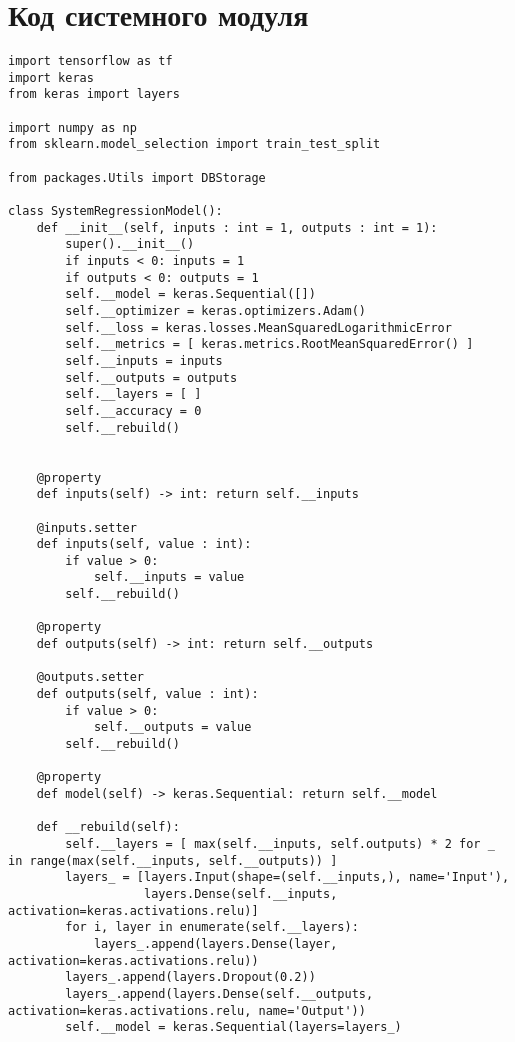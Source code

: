 \chapter{Код системного модуля}
\label{cha:appendix1}

\begin{verbatim}
import tensorflow as tf
import keras
from keras import layers

import numpy as np
from sklearn.model_selection import train_test_split

from packages.Utils import DBStorage

class SystemRegressionModel():
    def __init__(self, inputs : int = 1, outputs : int = 1):
        super().__init__()
        if inputs < 0: inputs = 1
        if outputs < 0: outputs = 1
        self.__model = keras.Sequential([])
        self.__optimizer = keras.optimizers.Adam()
        self.__loss = keras.losses.MeanSquaredLogarithmicError
        self.__metrics = [ keras.metrics.RootMeanSquaredError() ]
        self.__inputs = inputs
        self.__outputs = outputs
        self.__layers = [ ]
        self.__accuracy = 0
        self.__rebuild()


    @property
    def inputs(self) -> int: return self.__inputs
    
    @inputs.setter
    def inputs(self, value : int): 
        if value > 0: 
            self.__inputs = value
        self.__rebuild()
    
    @property
    def outputs(self) -> int: return self.__outputs
    
    @outputs.setter
    def outputs(self, value : int): 
        if value > 0: 
            self.__outputs = value
        self.__rebuild()
    
    @property
    def model(self) -> keras.Sequential: return self.__model
    
    def __rebuild(self):
        self.__layers = [ max(self.__inputs, self.outputs) * 2 for _ in range(max(self.__inputs, self.__outputs)) ]
        layers_ = [layers.Input(shape=(self.__inputs,), name='Input'), 
                   layers.Dense(self.__inputs, activation=keras.activations.relu)]
        for i, layer in enumerate(self.__layers):
            layers_.append(layers.Dense(layer, activation=keras.activations.relu))
        layers_.append(layers.Dropout(0.2))
        layers_.append(layers.Dense(self.__outputs, activation=keras.activations.relu, name='Output'))
        self.__model = keras.Sequential(layers=layers_)
        

\end{verbatim}

